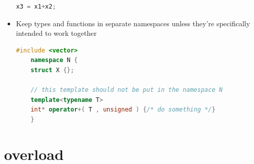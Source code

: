 \documentclass[a4paper,11pt,twoside]{book}
\begin{document}
\begin{itemize}
\begin{lstlisting}[frame=single, language=c++]
	x3 = x1+x2;
	\end{lstlisting}
	
	\item Keep types and functions in separate namespaces unless they're specifically intended to work together
	
	\begin{lstlisting}[frame=single, language=c++]
	#include <vector>
	namespace N {
	struct X {};
	
	// this template should not be put in the namespace N
	template<typename T>
	int* operator+( T , unsigned ) {/* do something */}
	}
	\end{lstlisting}
\end{itemize}

\section{overload}
\end{document}

